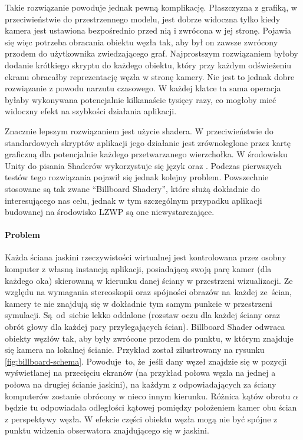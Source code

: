 
Takie rozwiązanie powoduje jednak pewną komplikację. Płaszczyzna z grafiką, w przeciwieństwie do przestrzennego modelu, jest dobrze widoczna tylko kiedy kamera jest ustawiona bezpośrednio przed nią i zwrócona w jej stronę. Pojawia się więc potrzeba obracania obiektu węzła tak, aby był on zawsze zwrócony przodem do użytkownika zwiedzającego graf. Najprostszym rozwiązaniem byłoby dodanie krótkiego skryptu do każdego obiektu, który przy każdym odświeżeniu ekranu obracałby reprezentację węzła w stronę kamery. Nie jest to jednak dobre rozwiązanie z powodu narzutu czasowego. W każdej klatce ta sama operacja byłaby wykonywana potencjalnie kilkanaście tysięcy razy, co mogłoby mieć widoczny efekt na szybkości działania aplikacji.

Znacznie lepszym rozwiązaniem jest użycie shadera. W przeciwieństwie do standardowych skryptów aplikacji jego działanie jest zrównoleglone przez kartę graficzną dla potencjalnie każdego przetwarzanego wierzchołka. W środowisku Unity do pisania Shaderów wykorzystuje się język  oraz  \cite{UnityShaders}. Podczas pierwszych testów tego rozwiązania pojawił się jednak kolejny problem. Powszechnie stosowane są tak zwane ``Billboard Shadery'', które służą dokładnie do interesującego nas celu, jednak w tym szczególnym przypadku aplikacji budowanej na środowisko LZWP są one niewystarczające. 

\paragraph{Problem} Każda ściana jaskini rzeczywistości wirtualnej jest kontrolowana przez osobny komputer z własną instancją aplikacji, posiadającą swoją parę kamer (dla każdego oka) skierowaną w kierunku danej ściany w przestrzeni wizualizacji. Ze względu na wymagania stereoskopii oraz spójności obrazów na~każdej ze~ścian, kamery te nie znajdują się w dokładnie tym samym punkcie w przestrzeni symulacji. Są~od~siebie lekko oddalone (rozstaw oczu dla każdej ściany oraz obrót głowy dla każdej pary przylegających ścian). Billboard Shader odwraca obiekty węzłów tak, aby były zwrócone przodem do punktu, w którym znajduje się kamera na lokalnej ścianie. Przykład został zilustrowany na rysunku \ref{fig:billboard-schema}. Powoduje~to, że~jeśli dany węzeł znajdzie się w pozycji wyświetlanej na przecięciu ekranów (na przykład połowa węzła na jednej a połowa na drugiej ścianie jaskini), na każdym z odpowiadających za ściany komputerów zostanie obrócony w nieco innym kierunku. Różnica kątów obrotu \(\alpha\) będzie tu odpowiadała odległości kątowej pomiędzy położeniem kamer obu ścian z perspektywy węzła. W efekcie części obiektu węzła mogą nie być spójne z punktu widzenia obserwatora znajdującego się w jaskini.


